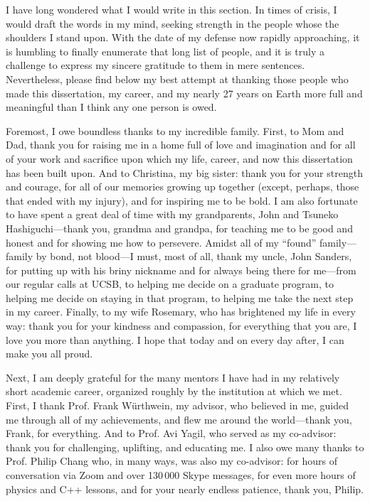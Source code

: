 \begin{acknowledgements}
I have long wondered what I would write in this section. 
In times of crisis, I would draft the words in my mind, seeking strength in the people whose the shoulders I stand upon. 
With the date of my defense now rapidly approaching, it is humbling to finally enumerate that long list of people, and it is truly a challenge to express my sincere gratitude to them in mere sentences. 
Nevertheless, please find below my best attempt at thanking those people who made this dissertation, my career, and my nearly 27 years on Earth more full and meaningful than I think any one person is owed.

Foremost, I owe boundless thanks to my incredible family. 
First, to Mom and Dad, thank you for raising me in a home full of love and imagination and for all of your work and sacrifice upon which my life, career, and now this dissertation has been built upon. 
And to Christina, my big sister: thank you for your strength and courage, for all of our memories growing up together (except, perhaps, those that ended with my injury), and for inspiring me to be bold. 
I am also fortunate to have spent a great deal of time with my grandparents, John and Tsuneko Hashiguchi---thank you, grandma and grandpa, for teaching me to be good and honest and for showing me how to persevere. 
Amidst all of my ``found'' family---family by bond, not blood---I must, most of all, thank my uncle, John Sanders, for putting up with his briny nickname and for always being there for me---from our regular calls at UCSB, to helping me decide on a graduate program, to helping me decide on staying in that program, to helping me take the next step in my career. 
Finally, to my wife Rosemary, who has brightened my life in every way: thank you for your kindness and compassion, for everything that you are, I love you more than anything. 
I hope that today and on every day after, I can make you all proud.

Next, I am deeply grateful for the many mentors I have had in my relatively short academic career, organized roughly by the institution at which we met. 
First, I thank Prof. Frank W\"urthwein, my advisor, who believed in me, guided me through all of my achievements, and flew me around the world---thank you, Frank, for everything. 
And to Prof. Avi Yagil, who served as my co-advisor: thank you for challenging, uplifting, and educating me. 
I also owe many thanks to Prof. Philip Chang who, in many ways, was also my co-advisor: for hours of conversation via Zoom and over 130\,000 Skype messages, for even more hours of physics and C++ lessons, and for your nearly endless patience, thank you, Philip. 


\end{acknowledgements}
